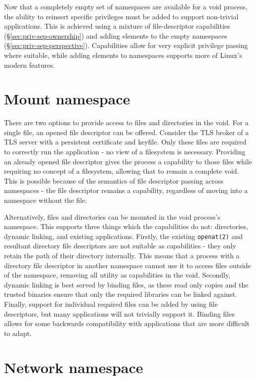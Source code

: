 \documentclass[12pt,a4paper,twoside]{report}
\begin{document}
Now that a completely empty set of namespaces are available for a void process, the ability to reinsert specific privileges must be added to support non-trivial applications. This is achieved using a mixture of file-descriptor capabilities (§\ref{sec:priv-sep-ownership}) and adding elements to the empty namespaces (§\ref{sec:priv-sep-perspective}). Capabilities allow for very explicit privilege passing where suitable, while adding elements to namespaces supports more of Linux's modern features.

\section{Mount namespace}
\label{sec:filling-mount}

There are two options to provide access to files and directories in the void. For a single file, an opened file descriptor can be offered. Consider the TLS broker of a TLS server with a persistent certificate and keyfile. Only these files are required to correctly run the application - no view of a filesystem is necessary. Providing an already opened file descriptor gives the process a capability to those files while requiring no concept of a filesystem, allowing that to remain a complete void. This is possible because of the semantics of file descriptor passing across namespaces - the file descriptor remains a capability, regardless of moving into a namespace without the file.

Alternatively, files and directories can be mounted in the void process's namespace. This supports three things which the capabilities do not: directories, dynamic linking, and existing applications. Firstly, the existing \texttt{openat(2)} and resultant directory file descriptors are not suitable as capabilities - they only retain the path of their directory internally. This means that a process with a directory file descriptor in another namespace cannot use it to access files outside of the namespace, removing all utility as capabilities in the void. Secondly, dynamic linking is best served by binding files, as these read only copies and the trusted binaries ensure that only the required libraries can be linked against. Finally, support for individual required files can be added by using file descriptors, but many applications will not trivially support it. Binding files allows for some backwards compatibility with applications that are more difficult to adapt.

\section{Network namespace}
\label{sec:filling-net}
\end{document}
